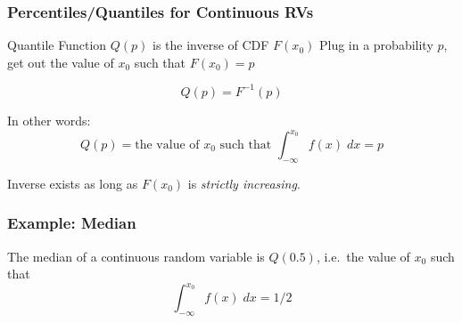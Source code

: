 \documentclass[handout]{beamer}
\begin{document}
\begin{frame}
\frametitle{Percentiles/Quantiles for Continuous RVs}
\begin{block}{Quantile Function $Q(p)$ is the inverse of CDF $F(x_0)$}
Plug in a probability $p$, get out the value of $x_0$ such that $F(x_0)=p$
\end{block}
$$Q(p) = F^{-1}(p)$$

In other words:
	$$Q(p) = \mbox{the value of } x_0 \mbox{ such that } \int_{-\infty}^{x_0} f(x) \; dx = p$$
	
\begin{alertblock}{Inverse exists as long as $F(x_0)$ is \emph{strictly increasing}.} \end{alertblock}	
	
\end{frame}
\begin{frame}
\frametitle{Example: Median}
The median of a continuous random variable is $Q(0.5)$, i.e.\ the value of $x_0$ such that 
	$$\int_{-\infty}^{x_0} f(x)\; dx = 1/2$$
\end{frame}
\end{document}
